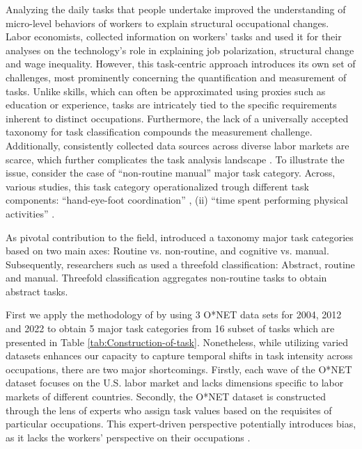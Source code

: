 \begin{onehalfspace}
Analyzing the daily tasks that people undertake improved the understanding
of micro-level behaviors of workers to explain structural occupational
changes. Labor economists, collected information on workers' tasks
and used it for their analyses on the technology's role in explaining
job polarization, structural change and wage inequality. However,
this task-centric approach introduces its own set of challenges, most
prominently concerning the quantification and measurement of tasks.
Unlike skills, which can often be approximated using proxies such
as education or experience, tasks are intricately tied to the specific
requirements inherent to distinct occupations. Furthermore, the lack
of a universally accepted taxonomy for task classification compounds
the measurement challenge. Additionally, consistently collected data
sources across diverse labor markets are scarce, which further complicates
the task analysis landscape \citep{Biagi2020}. To illustrate the
issue, consider the case of ``non-routine manual'' major task category.
Across, various studies, this task category operationalized trough
different task components: ``hand-eye-foot coordination'' \citep{2013Autor},
(ii) ``time spent performing physical activities''
\citep{2013Autora}.

As pivotal contribution to the field, \citet{2003Autor} introduced
a taxonomy major task categories based on two main axes: Routine vs.
non-routine, and cognitive vs. manual. Subsequently, researchers such
as \citet{2013Autora,2013Autor} used a threefold classification:
Abstract, routine and manual. Threefold classification aggregates
non-routine tasks to obtain abstract tasks.

First we apply the methodology of \citet{Acemoglu2011} by using 3
O{*}NET data sets for 2004, 2012 and 2022 to obtain 5 major task categories
from 16 subset of tasks which are presented in Table \ref{tab:Construction-of-task}.
Nonetheless, while utilizing varied datasets enhances our capacity
to capture temporal shifts in task intensity across occupations, there
are two major shortcomings. Firstly, each wave of the O{*}NET dataset
focuses on the U.S. labor market and lacks dimensions specific to
labor markets of different countries. Secondly, the O{*}NET dataset
is constructed through the lens of experts who assign task values
based on the requisites of particular occupations. This expert-driven
perspective potentially introduces bias, as it lacks the workers'
perspective on their occupations \citep{Aedo2013}.


\end{onehalfspace}
